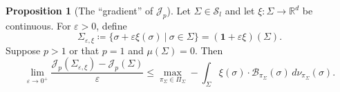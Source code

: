 \documentclass[preprint, reqno]{amsart}
\renewcommand{\epsilon}{\varepsilon}
\theoremstyle{definition}
\newtheorem{proposition}[definition]{Proposition}
\numberwithin{equation}{section}
\begin{document}
\begin{proposition}[The ``gradient'' of $\mathscr{J}_p$]
  \label{strongbarycentreapproximation}
  Let $\Sigma \in \mathcal{S}_l$ and let $\xi : \Sigma \to
  \mathbb{R}^d$ be continuous. For $\epsilon > 0$, define
  \begin{equation}\label{eq:perturbedsigma}
    \Sigma_{\epsilon, \xi} \coloneqq \{\sigma + \epsilon \xi(\sigma) \
    | \ \sigma \in \Sigma\} = (\mathbf{1} + \epsilon \xi)(\Sigma).
  \end{equation}
  Suppose $p > 1$ or that $p = 1$ and $\mu(\Sigma) = 0$.
  Then
  \begin{equation} \lim_{\varepsilon \to 0^{+}}
    \frac{\mathscr{J}_p(\Sigma_{\varepsilon, \xi}) -
      \mathscr{J}_p(\Sigma)}{\varepsilon} \leq \max_{\pi_{\Sigma}\in
      \Pi_{\Sigma}}- \int_\Sigma \xi(\sigma) \cdot
    \mathcal{B}_{\pi_\Sigma}(\sigma) \,
    d\nu_{\pi_{\Sigma}}(\sigma). \label{eq:fbary-grad-J-min}
  \end{equation}
\end{proposition}
\end{document}
